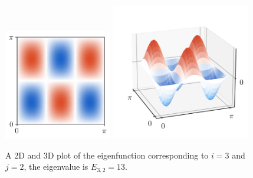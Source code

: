 \begin{figure}
    \begin{center}
        \includegraphics[width=0.42\textwidth]{img/chapter3/example_zero_2d.png}%
        \hfill%
        \includegraphics[width=0.54\textwidth]{img/chapter3/example_zero_3d.png}
    \end{center}
    \caption{A 2D and 3D plot of the eigenfunction corresponding to $i = 3$ and $j = 2$, the eigenvalue is $E_{3,2} = 13$.}\label{fig:example_zero}
\end{figure}


